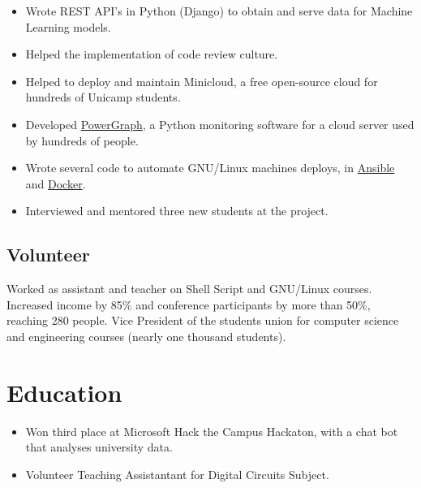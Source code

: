 \documentclass[10pt, a4paper, roman]{moderncv} %
\begin{document}
{
    \begin{itemize}
        \item Wrote REST API's in Python (Django) to obtain and serve data for Machine Learning models. 
        \item Helped the implementation of code review culture.
    \end{itemize}
}
{
    \begin{itemize}
        \item Helped to deploy and maintain Minicloud, a free open-source cloud for hundreds of Unicamp students.
        \item Developed \href{https://github.com/Guilhermeslucas/powergraph}{PowerGraph}, a Python monitoring software for a cloud server used by hundreds of people.
        \item Wrote several code to automate GNU/Linux machines deploys, in \href{https://github.com/Guilhermeslucas/Ansible-Code}{Ansible} and 
            \href{https://github.com/Guilhermeslucas/Dockerfiles}{Docker}.
        \item Interviewed and mentored three new students at the project.
    \end{itemize}
}
\subsection{Volunteer}
{
    Worked as assistant and teacher on Shell Script and GNU/Linux courses.
}
{
    Increased income by 85\% and conference participants by more than 50\%, reaching 280 people.
}
{
    Vice President of the students union for computer science and engineering courses (nearly one thousand students).
}
\section{Education}

{
    \begin{itemize}
        \item Won third place at Microsoft Hack the Campus Hackaton, with a chat bot that analyses university data.
        \item Volunteer Teaching Assistantant for Digital Circuits Subject.
    \end{itemize} 
}
\end{document}
